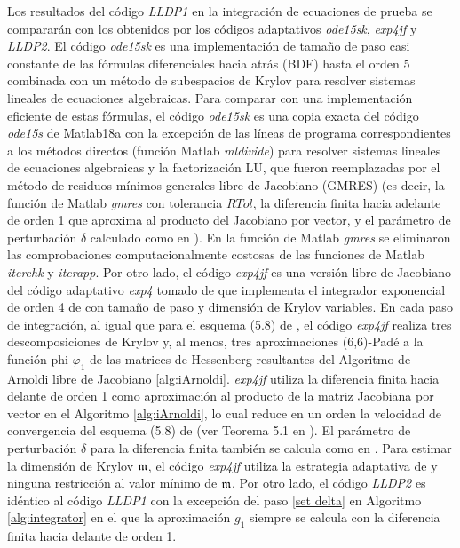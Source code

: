Los resultados del código \emph{LLDP1} en la integración de ecuaciones de prueba se compararán con los obtenidos por los códigos adaptativos \emph{ode15sk}, \emph{exp4jf} y \emph{LLDP2}. El código \emph{ode15sk} es una implementación de tamaño de paso casi constante de las fórmulas diferenciales hacia atrás (BDF) hasta el orden 5 combinada con un método de subespacios de Krylov para resolver sistemas lineales de ecuaciones algebraicas. Para comparar con una implementación eficiente de estas fórmulas, el código \emph{ode15sk} es una copia exacta del código \emph{ode15s} \cite{shampine1997matlab} de Matlab18a con la excepción de las líneas de programa correspondientes a los métodos directos (función Matlab \emph{mldivide}) para resolver sistemas lineales de ecuaciones algebraicas y la factorización LU, que fueron reemplazadas por el método de residuos mínimos generales libre de Jacobiano (GMRES) (es decir, la función de Matlab \emph{gmres} con tolerancia $RTol$, la diferencia finita  hacia adelante de orden 1 que aproxima al producto del Jacobiano por  vector, y el parámetro de perturbación $\delta$ calculado como en \cite{knoll2004jacobian}). En la función de Matlab \emph{gmres} se eliminaron las comprobaciones computacionalmente costosas de las funciones de Matlab \emph{iterchk} y \emph{iterapp}. Por otro lado, el código \emph{exp4jf} es una versión libre de Jacobiano del código adaptativo \emph{exp4} tomado de \cite{jansing2011expode} que implementa el integrador exponencial de orden 4 de \cite{hochbruck1998exponential} con tamaño de paso y dimensión de Krylov variables.
En cada paso de integración, al igual que para el esquema (5.8) de \cite{hochbruck1998exponential}, el código \textit{exp4jf} realiza tres descomposiciones de Krylov y, al menos, tres aproximaciones (6,6)-Padé a la función phi $\varphi_1$ de las matrices de Hessenberg resultantes del Algoritmo de Arnoldi libre de Jacobiano \ref{alg:iArnoldi}. \textit{exp4jf} utiliza la diferencia finita hacia delante de orden 1 como aproximación al producto de la matriz Jacobiana por vector en el Algoritmo \ref{alg:iArnoldi}, lo cual reduce en un orden la velocidad de convergencia del esquema (5.8) de \cite{hochbruck1998exponential} (ver Teorema 5.1 en \cite{hochbruck1998exponential}).
El parámetro de perturbación $\delta$ para la diferencia finita también se calcula como en \cite{knoll2004jacobian}. Para estimar la dimensión de Krylov $\mathfrak{m}$, el código \textit{exp4jf} utiliza la estrategia adaptativa de \cite{hochbruck1998exponential} y ninguna restricción al valor mínimo de $\mathfrak{m}$. Por otro lado, el código \emph{LLDP2} es idéntico al código \emph{LLDP1} con la excepción del paso \ref{set delta} en Algoritmo \ref{alg:integrator} en el que la aproximación $g_1$ siempre se calcula con la diferencia finita hacia delante de orden 1.

